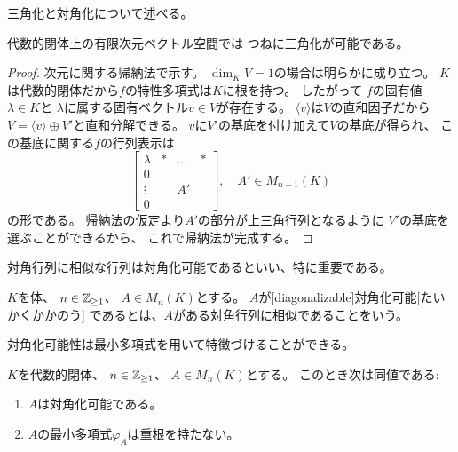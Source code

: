 \documentclass[report]{jlreq}
\begin{document}
三角化と対角化について述べる。

\begin{definition}[三角化可能]
    \TODO{}
\end{definition}

代数的閉体上の有限次元ベクトル空間では
つねに三角化が可能である。


\begin{proof}
    次元に関する帰納法で示す。
    $\dim_K V = 1$の場合は明らかに成り立つ。
    $K$は代数的閉体だから$f$の特性多項式は$K$に根を持つ。
    したがって
    $f$の固有値$\lambda \in K$と
    $\lambda$に属する固有ベクトル$v \in V$が存在する。
    $\langle v \rangle$は$V$の直和因子だから
    $V = \langle v \rangle \oplus V'$と直和分解できる。
    $v$に$V'$の基底を付け加えて$V$の基底が得られ、
    この基底に関する$f$の行列表示は
    \begin{equation}
        \begin{bmatrix}
            \lambda & * & \dots & * \\
            0 \\
            \vdots & & A' \\
            0
        \end{bmatrix},
        \quad
        A' \in M_{n - 1}(K)
    \end{equation}
    の形である。
    帰納法の仮定より$A'$の部分が上三角行列となるように
    $V'$の基底を選ぶことができるから、
    これで帰納法が完成する。
\end{proof}

対角行列に相似な行列は対角化可能であるといい、特に重要である。

\begin{definition}[対角化可能]
    $K$を体、
    $n \in \mathbb{Z}_{\ge 1}$、
    $A \in M_n(K)$とする。
    $A$が[diagonalizable]{対角化可能}[たいかくかかのう]
    であるとは、$A$がある対角行列に相似であることをいう。
\end{definition}

対角化可能性は最小多項式を用いて特徴づけることができる。

\begin{theorem}[対角化可能性の特徴づけ]
    $K$を代数的閉体、
    $n \in \mathbb{Z}_{\ge 1}$、
    $A \in M_n(K)$とする。
    このとき次は同値である:
    \begin{enumerate}
        \item $A$は対角化可能である。
        \item $A$の最小多項式$\varphi_A$は重根を持たない。
    \end{enumerate}
\end{theorem}
\end{document}
